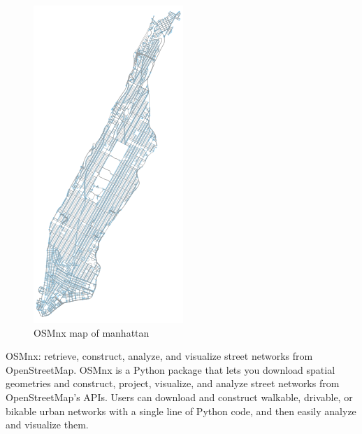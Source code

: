 \begin{figure}[h]
\centering \includegraphics[scale=0.6]{input/images/osmnx.png}
\caption{OSMnx map of manhattan}
\end{figure}
OSMnx: retrieve, construct, analyze, and visualize street networks from OpenStreetMap. OSMnx is a Python package that lets you download spatial geometries and construct, project, visualize, and analyze street networks from OpenStreetMap’s APIs. Users can download and construct walkable, drivable, or bikable urban networks with a single line of Python code, and then easily analyze and visualize them.\\

